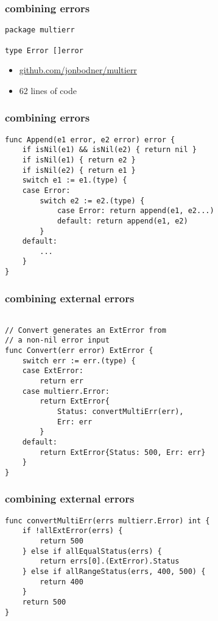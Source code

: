\documentclass{beamer}
\begin{document}
\begin{frame}[fragile]
\frametitle{combining errors}
\begin{lstlisting}[basicstyle=\ttfamily\footnotesize]
package multierr

type Error []error

\end{lstlisting}
\begin{itemize}
\item \href{https://github.com/jonbodner/multierr}{github.com/jonbodner/multierr}
\item 62 lines of code
\end{itemize}
\end{frame}

\begin{frame}[fragile]
\frametitle{combining errors}
\begin{lstlisting}[basicstyle=\ttfamily\footnotesize]
func Append(e1 error, e2 error) error {
	if isNil(e1) && isNil(e2) { return nil }
	if isNil(e1) { return e2 }
	if isNil(e2) { return e1 }
	switch e1 := e1.(type) {
	case Error:
		switch e2 := e2.(type) {
			case Error: return append(e1, e2...)
			default: return append(e1, e2)
		}
	default:
		...
	}
}
\end{lstlisting}
\end{frame}

\begin{frame}[fragile]
\frametitle{combining external errors}
\begin{lstlisting}[basicstyle=\ttfamily\footnotesize]

// Convert generates an ExtError from
// a non-nil error input
func Convert(err error) ExtError {
	switch err := err.(type) {
	case ExtError:
		return err
	case multierr.Error:
		return ExtError{
			Status: convertMultiErr(err),
			Err: err
		}
	default:
		return ExtError{Status: 500, Err: err}
	}
}
\end{lstlisting}
\end{frame}

\begin{frame}[fragile]
\frametitle{combining external errors}
\begin{lstlisting}[basicstyle=\ttfamily\footnotesize]
func convertMultiErr(errs multierr.Error) int {
	if !allExtError(errs) {
		return 500
	} else if allEqualStatus(errs) {
		return errs[0].(ExtError).Status
	} else if allRangeStatus(errs, 400, 500) {
		return 400
	}
	return 500
}
\end{lstlisting}
\end{frame}
\end{document}
